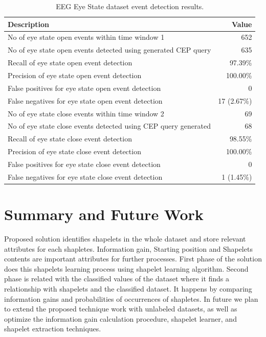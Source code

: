 \documentclass[conference]{IEEEtran}  %
\begin{document}
\begin{table}
\centering
\caption{EEG Eye State dataset event detection results.}
\begin{tabular}{ | m{6cm} | m{2.3cm}| } 
 \hline 
\textbf{Description} & \multicolumn{1}{|r|}{\textbf{Value}}\\
\hline
No of eye state open events within time window 1 & \multicolumn{1}{|r|}{652}\\
\hline
No of eye state open events detected using generated CEP query & \multicolumn{1}{|r|}{635}\\
\hline
Recall of eye state open event detection & \multicolumn{1}{|r|}{97.39\%}\\
\hline
Precision of eye state open event detection & \multicolumn{1}{|r|}{100.00\%}\\
\hline
False positives for eye state open event detection & \multicolumn{1}{|r|}{0}\\
\hline
False negatives for eye state open event detection & \multicolumn{1}{|r|}{17 (2.67\%)}\\
\hline
No of eye state close events within time window 2 & \multicolumn{1}{|r|}{69}\\
\hline
No of eye state close events detected using CEP query generated & \multicolumn{1}{|r|}{68}\\
\hline
Recall of eye state close event detection & \multicolumn{1}{|r|}{98.55\%}\\
\hline
Precision of eye state close event detection & \multicolumn{1}{|r|}{100.00\%}\\
\hline
False positives for eye state close event detection & \multicolumn{1}{|r|}{0}\\
\hline
False negatives for eye state close event detection & \multicolumn{1}{|r|}{1 (1.45\%)}\\
\hline

\end{tabular}
\end{table}

\section{Summary and Future Work}

Proposed solution identifies shapelets in the whole dataset and store relevant attributes for each shapletes. Information gain, Starting position and Shapelets contents are important attributes for further processes. First phase of the solution does this shapelets learning process using shapelet learning algorithm. Second phase is related with the classified values of the dataset where it finds a relationship with shapelets and the classified dataset. It happens by comparing information gains and probabilities of occurrences of shapletes. In future we plan to extend the proposed technique work with unlabeled datasets, as well as optimize the information gain calculation procedure, shapelet learner, and shapelet extraction techniques.

\nocite{*}


\end{document}

